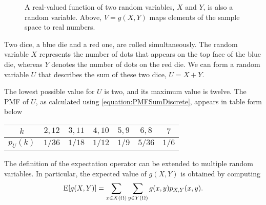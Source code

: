 \begin{figure}[ht]
\begin{center}
\begin{footnotesize}
\end{footnotesize}
\caption{A real-valued function of two random variables, $X$ and $Y$, is also a random variable.
Above, $V = g(X, Y)$ maps elements of the sample space to real numbers.}
\end{center}
\end{figure}

\begin{example} \label{example:SumDice1}
Two dice, a blue die and a red one, are rolled simultaneously.
The random variable $X$ represents the number of dots that appears on the top face of the blue die, whereas $Y$ denotes the number of dots on the red die.
We can form a random variable $U$ that describes the sum of these two dice, $U = X + Y$.

The lowest possible value for $U$ is two, and its maximum value is twelve.
The PMF of $U$, as calculated using \eqref{equation:PMFSumDiscrete}, appears in table form below
\begin{center}
\begin{tabular}{|c|c|c|c|c|c|c|}
\hline
$k$ & $2, 12$ & $3, 11$ & $4, 10$ & $5, 9$ & $6, 8$ & $7$ \\
\hline
$p_U (k)$ & $1/36$ & $1/18$ & $1/12$ & $1/9$ & $5/36$ & $1/6$ \\
\hline
\end{tabular}
\end{center}
\end{example}

The definition of the expectation operator can be extended to multiple random variables.
In particular, the expected value of $g(X,Y)$ is obtained by computing
\begin{equation} \label{equation:ExpectationMultipleRV}
\mathrm{E} [g(X,Y)] = \sum_{x \in X(\Omega)} \sum_{y \in Y(\Omega)} g(x,y) p_{X,Y} (x,y) .
\end{equation}

